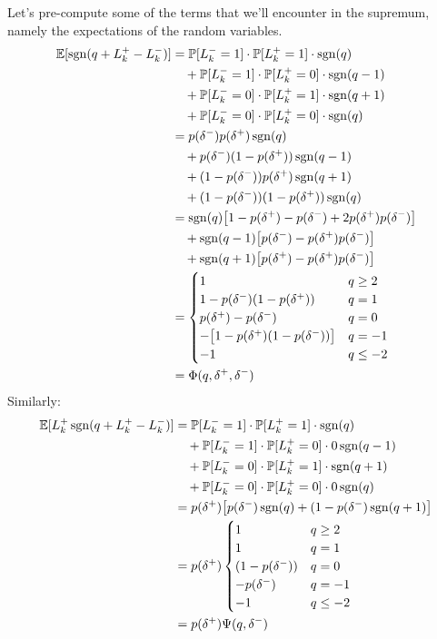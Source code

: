 Let's pre-compute some of the terms that we'll encounter in the supremum, namely the expectations of the random variables. 
\begin{align}
\mathbb{E} [\operatorname{\mathrm{sgn}}(q + L_k^+ - L_k^-)] & = \mathbb{P}[L_k^- = 1] \cdot \mathbb{P}[L_k^+ = 1] \cdot \operatorname{\mathrm{sgn}}(q) \nonumber \\
& \quad + \mathbb{P}[L_k^- = 1] \cdot \mathbb{P}[L_k^+ = 0] \cdot \operatorname{\mathrm{sgn}}(q - 1) \nonumber \\
& \quad +  \mathbb{P}[L_k^- = 0] \cdot \mathbb{P}[L_k^+ = 1] \cdot \operatorname{\mathrm{sgn}}(q+1) \nonumber \\
& \quad + \mathbb{P}[L_k^- = 0] \cdot \mathbb{P}[L_k^+ = 0] \cdot \operatorname{\mathrm{sgn}}(q) \nonumber \\
& = p(\delta^-)p(\delta^+) \operatorname{\mathrm{sgn}}(q) \nonumber \\
& \quad + p(\delta^-) (1-p(\delta^+)) \operatorname{\mathrm{sgn}}(q - 1) \nonumber \\
& \quad + (1 - p(\delta^-)) p(\delta^+)  \operatorname{\mathrm{sgn}}(q+1) \nonumber \\
& \quad + (1 - p(\delta^-)) (1-p(\delta^+))  \operatorname{\mathrm{sgn}}(q) \nonumber \\
& = \operatorname{\mathrm{sgn}}(q) \bigl[ 1 - p(\delta^+) - p(\delta^-) + 2 p(\delta^+) p(\delta^-) \bigr] \nonumber \\
& \quad + \operatorname{\mathrm{sgn}}(q-1) \bigl[ p(\delta^-)  - p(\delta^+) p(\delta^-) \bigr]  \nonumber \\
& \quad + \operatorname{\mathrm{sgn}}(q+1) \bigl[ p(\delta^+)  - p(\delta^+) p(\delta^-) \bigr]  \nonumber \\
& = \begin{cases} 
1 & q \geq 2 \\
1 - p(\delta^-)(1 - p(\delta^+)) & q = 1 \\
p(\delta^+) - p(\delta^-) & q = 0 \\
-\bigl[ 1 - p(\delta^+)(1 - p(\delta^-)) \bigr] & q = -1 \\
-1 & q \leq -2
\end{cases} \\
& = \Phi(q, \delta^+, \delta^-)
\end{align}
Similarly:
\begin{align}
\mathbb{E} [ L_k^+ \operatorname{\mathrm{sgn}}(q + L_k^+ - L_k^-)] & = \mathbb{P}[L_k^- = 1] \cdot \mathbb{P}[L_k^+ = 1] \cdot \operatorname{\mathrm{sgn}}(q) \nonumber \\
& \quad + \mathbb{P}[L_k^- = 1] \cdot \mathbb{P}[L_k^+ = 0] \cdot 0 \operatorname{\mathrm{sgn}}(q - 1) \nonumber \\
& \quad +  \mathbb{P}[L_k^- = 0] \cdot \mathbb{P}[L_k^+ = 1] \cdot \operatorname{\mathrm{sgn}}(q+1) \nonumber \\
& \quad + \mathbb{P}[L_k^- = 0] \cdot \mathbb{P}[L_k^+ = 0] \cdot 0 \operatorname{\mathrm{sgn}}(q) \nonumber \\
& = p(\delta^+) \bigl[ p(\delta^-) \operatorname{\mathrm{sgn}}(q) + (1-p(\delta^-) \operatorname{\mathrm{sgn}}(q+1) \bigr] \nonumber \\
& = p(\delta^+) \begin{cases} 
1 & q \geq 2 \\
1 & q = 1 \\
(1 - p(\delta^-)) & q = 0 \\
-p(\delta^-) & q = -1 \\
-1 & q \leq -2
\end{cases} \\
& = p(\delta^+) \Psi(q, \delta^-)
\end{align}
